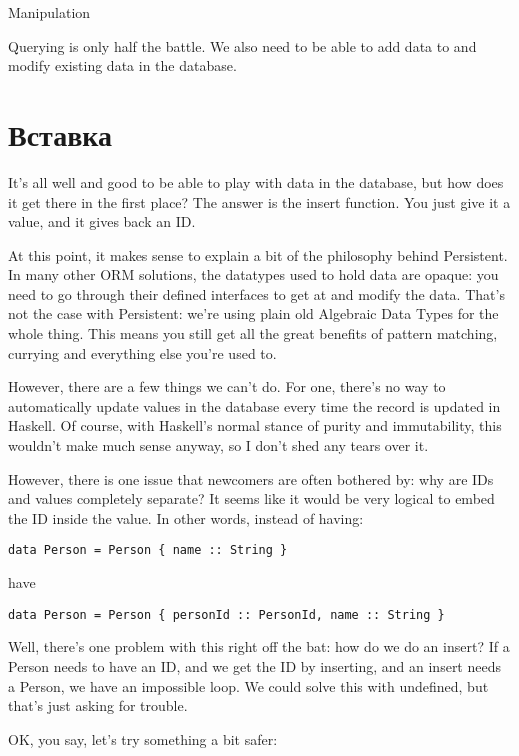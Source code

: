 Manipulation %

Querying is only half the battle. We also need to be able to add data to and modify existing data in the database.

\section{Вставка} %

It's all well and good to be able to play with data in the database, but how does it get there in the first place? The answer is the insert function. You just give it a value, and it gives back an ID.

At this point, it makes sense to explain a bit of the philosophy behind Persistent. In many other ORM solutions, the datatypes used to hold data are opaque: you need to go through their defined interfaces to get at and modify the data. That's not the case with Persistent: we're using plain old Algebraic Data Types for the whole thing. This means you still get all the great benefits of pattern matching, currying and everything else you're used to.

However, there are a few things we can't do. For one, there's no way to automatically update values in the database every time the record is updated in Haskell. Of course, with Haskell's normal stance of purity and immutability, this wouldn't make much sense anyway, so I don't shed any tears over it.

However, there is one issue that newcomers are often bothered by: why are IDs and values completely separate? It seems like it would be very logical to embed the ID inside the value. In other words, instead of having:

\begin{lstlisting}
data Person = Person { name :: String }
\end{lstlisting}

have

\begin{lstlisting}
data Person = Person { personId :: PersonId, name :: String }
\end{lstlisting}

Well, there's one problem with this right off the bat: how do we do an insert? If a Person needs to have an ID, and we get the ID by inserting, and an insert needs a Person, we have an impossible loop. We could solve this with undefined, but that's just asking for trouble.

OK, you say, let's try something a bit safer:

